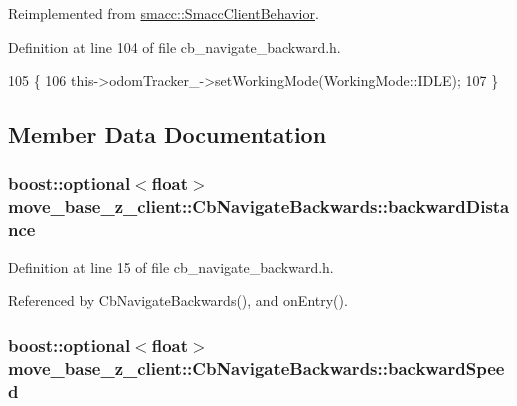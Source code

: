 Reimplemented from \hyperlink{classsmacc_1_1SmaccClientBehavior_ac0cd72d42bd00425362a97c9803ecce5}{smacc\+::\+Smacc\+Client\+Behavior}.



Definition at line 104 of file cb\+\_\+navigate\+\_\+backward.\+h.


\begin{DoxyCode}
105     \{
106         this->odomTracker\_->setWorkingMode(WorkingMode::IDLE);
107     \}
\end{DoxyCode}


\subsection{Member Data Documentation}
\subsubsection[{\texorpdfstring{backward\+Distance}{backwardDistance}}]{\setlength{\rightskip}{0pt plus 5cm}boost\+::optional$<$float$>$ move\+\_\+base\+\_\+z\+\_\+client\+::\+Cb\+Navigate\+Backwards\+::backward\+Distance}\hypertarget{classmove__base__z__client_1_1CbNavigateBackwards_a53d06922eff285e4d35f4d7b1b7b7752}{}\label{classmove__base__z__client_1_1CbNavigateBackwards_a53d06922eff285e4d35f4d7b1b7b7752}


Definition at line 15 of file cb\+\_\+navigate\+\_\+backward.\+h.



Referenced by Cb\+Navigate\+Backwards(), and on\+Entry().

\subsubsection[{\texorpdfstring{backward\+Speed}{backwardSpeed}}]{\setlength{\rightskip}{0pt plus 5cm}boost\+::optional$<$float$>$ move\+\_\+base\+\_\+z\+\_\+client\+::\+Cb\+Navigate\+Backwards\+::backward\+Speed}\hypertarget{classmove__base__z__client_1_1CbNavigateBackwards_ad5214ee636b6987d9d1c98458d500b4b}{}\label{classmove__base__z__client_1_1CbNavigateBackwards_ad5214ee636b6987d9d1c98458d500b4b}


